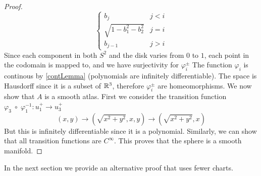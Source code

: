 \documentclass[11pt,a4paper]{report}
\begin{document}
\begin{proof}
\[\begin{cases}
                                   b_j & j<i \\
                                   \sqrt{1-b_1^2-b_2^2} & j=i \\
                                   b_{j-1} & j>i
  \end{cases}
\]
Since each component in both $S^2$ and the disk varies from $0$ to $1$, each point in the codomain is mapped to, and we have surjectivity for $\varphi_i^{\pm}$
\newline
The function $\varphi_i$ is continous by \ref{contLemma} (polynomials are infinitely differentiable).
\newline
The space is Hausdorff since it is a subset of $\mathbb{R}^3$, therefore $\varphi_{i}^{\pm}$ are homeomorphisms.
\newline
We now show that $A$ is a smooth atlas. First we consider the transition function $ \varphi_3 \; \circ \; \varphi_1^{-1}: u_1^{+} \to u_3^{+}$
$$(x,y) \to (\sqrt{x^2+y^2},x,y) \to (\sqrt{x^2+y^2},x)$$
But this is infinitely differentiable since it is a polynomial. Similarly, we can show that all transition functions are $C^{\infty}$.
This proves that the sphere is a smooth manifold.
\end{proof}
\noindent In the next section we provide an alternative proof that uses fewer charts.
\end{document}
